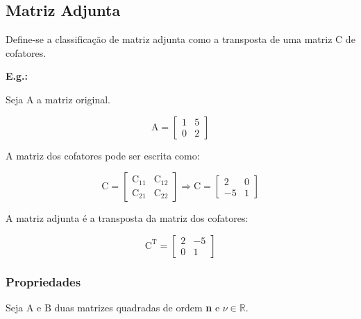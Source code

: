 \documentclass[a4paper,12pt]{article}
\begin{document}
\subsection{Matriz Adjunta}

Define-se a classificação de matriz adjunta como a transposta de uma matriz $ \text{C} $ de cofatores.

\textbf{E.g.:}

Seja $ \text{A} $ a matriz original.

 $$ \text{A} = \begin{bmatrix}
1 & 5 \\
0 & 2
\end{bmatrix} $$

A matriz dos cofatores pode ser escrita como:

$$ \text{C} = \begin{bmatrix}
\text{C}_{11} & \text{C}_{12}\\
\text{C}_{21} & \text{C}_{22}
\end{bmatrix} \Rightarrow \text{C} = \begin{bmatrix}
2 & 0 \\
-5 & 1
\end{bmatrix} $$

A matriz adjunta é a transposta da matriz dos cofatores:

$$ \text{C}^{\text{T}} = \begin{bmatrix}
2 & -5 \\
0 & 1
\end{bmatrix} $$

\subsubsection{Propriedades}

Seja $ \text{A} $ e $ \text{B} $ duas matrizes quadradas de ordem \textbf{n} e $ \nu \in \mathbb{R}$.
\end{document}
